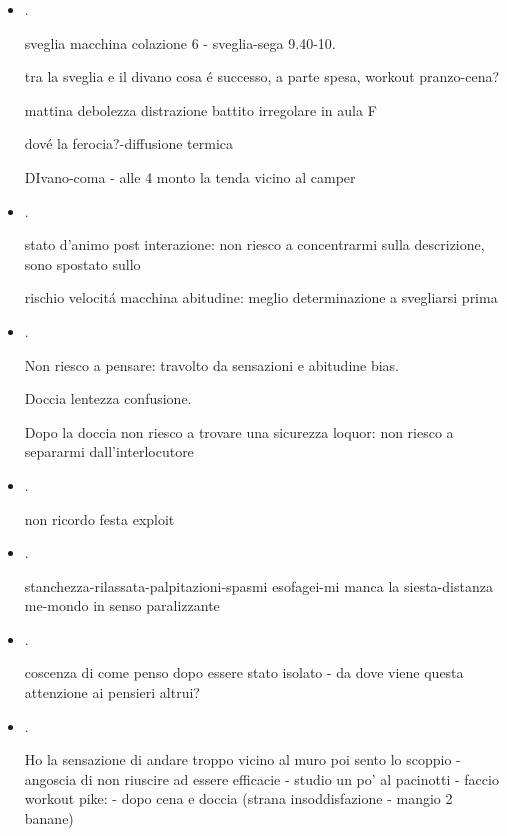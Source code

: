\begin{itemize}
\item {}.

sveglia macchina colazione 6 - sveglia-sega 9.40-10.

tra la sveglia e il divano cosa \'e successo, a parte spesa, workout pranzo-cena?

mattina debolezza distrazione battito irregolare in aula F

dov\'e la ferocia?-diffusione termica

DIvano-coma - alle 4 monto la tenda vicino al camper

\item {}.

stato d'animo post interazione: non riesco a concentrarmi sulla descrizione,  sono spostato sullo 

rischio velocit\'a macchina abitudine: meglio determinazione a svegliarsi prima

\item {}.

Non riesco a pensare: travolto da sensazioni e abitudine bias.

Doccia lentezza confusione.

Dopo la doccia non riesco a trovare una sicurezza loquor: non riesco a separarmi dall'interlocutore

\item {}.

non ricordo festa exploit

\item {}.

stanchezza-rilassata-palpitazioni-spasmi esofagei-mi manca la siesta-distanza me-mondo in senso paralizzante

\item {}.

coscenza di come penso dopo essere stato isolato - da dove viene questa attenzione ai pensieri altrui?


\item {}.

Ho la sensazione di andare troppo vicino al muro poi sento lo scoppio - angoscia di non riuscire ad essere efficacie - studio un po' al pacinotti - faccio workout pike:  - dopo cena e doccia (strana insoddisfazione - mangio 2 banane) 


\end{itemize}
